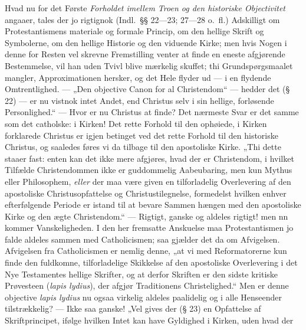 Hvad nu for det Første \emph{Forholdet imellem Troen og den
historiske Objectivitet} angaaer, tales der jo rigtignok (Indl.\
§§ 22---23; 27---28 o.\ fl.) Adskilligt om Protestantismens
materiale og formale Princip, om den hellige Skrift og
Symbolerne, om den hellige Historie og den viduende Kirke; men
hvis Nogen i denne for Resten vel skrevne Fremstilling venter at
finde en eneste afgjørende Bestemmelse, vil han uden Tvivl blive
mærkelig skuffet; thi Grundspørgsmaalet mangler, Approximationen
hersker, og det Hele flyder ud --- i en flydende Omtrentlighed.
--- „Den objective Canon for al Christendom“ --- hedder det
(§ 22) --- er nu vistnok intet Andet, end Christus selv i sin
hellige, forløsende Personlighed.“ --- Hvor er nu Christus at
finde? Det nærmeste Svar er det samme som det catholske: i Kirken!
Det rette Forhold til den ophøiede, i Kirken forklarede Christus
er igjen betinget ved det rette Forhold til den historiske
Christus, og saaledes føres vi da tilbage til den apostoliske
Kirke. „Thi dette staaer fast: enten kan det ikke mere afgjøres,
hvad der er Christendom, i hvilket Tilfælde Christendommen ikke er
guddommelig Aabeubaring, men kun Mythus eller Philosophem,
\emph{eller} der maa være given en tilforladelig Overlevering af
den apostoliske Christusopfattelse og Christustilegnelse,
formedelst hvilken enhver efterfølgende Periode er istand til at
bevare Sammen%
hængen med den apostoliske Kirke og den ægte Christendom.“ ---
Rigtigt, ganske og aldeles rigtigt! men nn kommer Vanskeligheden.
I den her fremsatte Anskuelse maa Protestantismen jo falde aldeles
sammen med Catholicismen; saa gjælder det da om Afvigelsen.
Afvigelsen fra Catholicismen er nemlig denne, „at vi med
Reformatorerne kun finde den fuldkomne, tilforladelige Skikkelse
af den apostoliske Overlevering i det Nye Testamentes hellige
Skrifter, og at derfor Skriften er den sidste kritiske Prøvesteen
(\textit{lapis lydius}), der afgjør Traditionens Christelighed.“
Men er denne objective \textit{lapis lydius} nu ogsaa virkelig
aldeles paalidelig og i alle Henseender tilstrækkelig? --- Ikke
saa ganske! „Vel gives der (§ 23) en Opfattelse af Skriftprincipet,
ifølge hvilken Intet kan have Gyldighed i Kirken, uden hvad der

